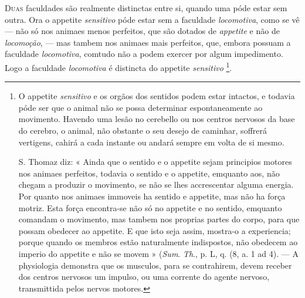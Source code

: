  
\textsc{Duas} faculdades são realmente distinctas entre si, quando uma póde estar sem outra. Ora o appetite \emph{sensitivo} póde estar sem a faculdade \emph{locomotiva}, como se vê --- não só nos animaes menos perfeitos, que são dotados de \emph{appetite} e não de \emph{locomoção}, --- mas tambem nos animaes mais perfeitos, que, embora possuam a faculdade \emph{locomotiva}, comtudo não a podem exercer por algum impedimento. Logo a faculdade \emph{locomotiva} é distincta do appetite \emph{sensitivo} \footnote{O appetite \emph{sensitivo} e os orgãos dos sentidos podem estar intactos, e todavia póde ser que o animal não se possa determinar espontaneamente ao movimento. Havendo uma lesão no cerebello ou nos centros nervosos da base do cerebro, o animal, não obstante o seu desejo de caminhar, soffrerá vertigens, cahirá a cada instante ou andará sempre em volta de si mesmo.\par S. Thomaz diz: « Ainda que o sentido e o appetite sejam principios motores nos animaes perfeitos, todavia o sentido e o appetite, emquanto aos, não chegam a produzir o movimento, se não se lhes accrescentar alguma energia. Por quanto nos animaes immoveis ha sentido e appetite, mas não ha força motriz. Esta força encontra-se não só no appetite e no sentido, emquanto comandam o movimento, mas tambem nos proprias partes do corpo, para que possam obedecer ao appetite. E que isto seja assim, mostra-o a experiencia; porque quando os membros estão naturalmente indispostos, não obedecem ao imperio do appetite e não se movem » (\emph{Sum}. \emph{Th}., p. L, q. (8, a. 1 ad 4). --- A physiologia demonstra que os musculos, para se contrahirem, devem receber dos centros nervosos um impulso, ou uma corrente do agente nervoso, transmittida pelos nervos motores.}.


